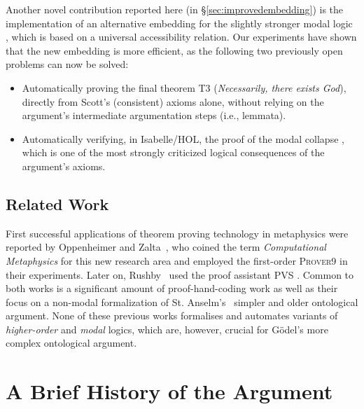 \documentclass{article}
\begin{document}
Another novel contribution reported here (in
\S\ref{sec:improvedembedding}) is the implementation of an alternative
embedding for the slightly stronger modal logic \SFiveU, which is
based on a universal accessibility relation. Our experiments have
shown that the new embedding is more efficient, as the following two
previously open problems can now be solved:
\begin{itemize}
\item Automatically proving the final theorem T3 (\textit{Necessarily, there
  exists God}), directly from Scott's  (consistent) axioms
  alone, without relying on the argument's intermediate argumentation
  steps (i.e., lemmata).
\item Automatically verifying, in Isabelle/HOL, the proof of the modal
  collapse \cite{Sobel}, which is one of the most strongly criticized
  logical consequences of the argument's axioms.
\end{itemize}


\subsection{Related Work}

First successful applications of theorem proving technology in
metaphysics were reported by Oppenheimer and
Zalta~, who coined the term \textit{Computational Metaphysics} for this new research area and employed the first-order
\textsc{Prover9} \cite{prover9-mace4} in their experiments. Later on, Rushby~ used the proof assistant \textsc{PVS} \cite{cade92-pvs}. Common to both
works is a significant amount of proof-hand-coding work as well as their
focus on a non-modal formalization of St. Anselm's~ simpler 
and older ontological argument. 
None of these previous works formalises and automates variants of \emph{higher-order} and \emph{modal} logics, which are, however, crucial
for G\"{o}del's more complex ontological argument.


\section{A Brief History of the Argument}\label{sec:history}
\end{document}
